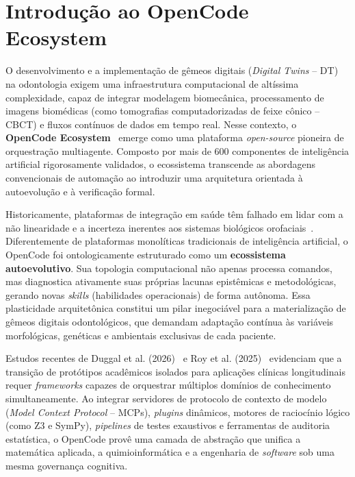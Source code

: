 \section{Introdução ao OpenCode Ecosystem}

O desenvolvimento e a implementação de gêmeos digitais (\textit{Digital Twins} -- DT) na odontologia exigem uma infraestrutura computacional de altíssima complexidade, capaz de integrar modelagem biomecânica, processamento de imagens biomédicas (como tomografias computadorizadas de feixe cônico -- CBCT) e fluxos contínuos de dados em tempo real. Nesse contexto, o \textbf{OpenCode Ecosystem}~\cite{opencode2026ecosystem} emerge como uma plataforma \textit{open-source} pioneira de orquestração multiagente. Composto por mais de 600 componentes de inteligência artificial rigorosamente validados, o ecossistema transcende as abordagens convencionais de automação ao introduzir uma arquitetura orientada à autoevolução e à verificação formal.

Historicamente, plataformas de integração em saúde têm falhado em lidar com a não linearidade e a incerteza inerentes aos sistemas biológicos orofaciais~\cite{Katsoulakis2024, Khoshfekr2025}. Diferentemente de plataformas monolíticas tradicionais de inteligência artificial, o OpenCode foi ontologicamente estruturado como um \textbf{ecossistema autoevolutivo}. Sua topologia computacional não apenas processa comandos, mas diagnostica ativamente suas próprias lacunas epistêmicas e metodológicas, gerando novas \textit{skills} (habilidades operacionais) de forma autônoma. Essa plasticidade arquitetônica constitui um pilar inegociável para a materialização de gêmeos digitais odontológicos, que demandam adaptação contínua às variáveis morfológicas, genéticas e ambientais exclusivas de cada paciente.


Estudos recentes de Duggal et al. (2026)~\cite{Duggal2026} e Roy et al. (2025)~\cite{Roy2025} evidenciam que a transição de protótipos acadêmicos isolados para aplicações clínicas longitudinais requer \textit{frameworks} capazes de orquestrar múltiplos domínios de conhecimento simultaneamente. Ao integrar servidores de protocolo de contexto de modelo (\textit{Model Context Protocol} -- MCPs), \textit{plugins} dinâmicos, motores de raciocínio lógico (como Z3 e SymPy), \textit{pipelines} de testes exaustivos e ferramentas de auditoria estatística, o OpenCode provê uma camada de abstração que unifica a matemática aplicada, a quimioinformática e a engenharia de \textit{software} sob uma mesma governança cognitiva.
